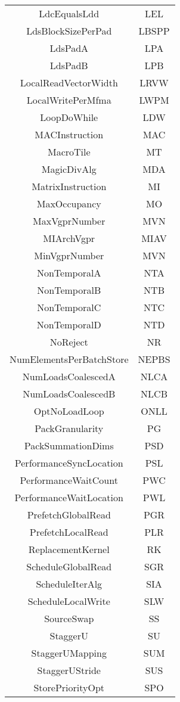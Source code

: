 \documentclass[]{article}
\begin{document}
\begin{center}
\begin{small}
\begin{longtable}{ |c|c| }
 LdcEqualsLdd & LEL \\
 LdsBlockSizePerPad & LBSPP \\
 LdsPadA & LPA \\
 LdsPadB & LPB \\
 LocalReadVectorWidth & LRVW \\
 LocalWritePerMfma & LWPM \\
 LoopDoWhile & LDW \\
 MACInstruction & MAC \\
 MacroTile & MT \\
 MagicDivAlg & MDA \\
 MatrixInstruction & MI \\
 MaxOccupancy & MO \\
 MaxVgprNumber & MVN \\
 MIArchVgpr & MIAV \\
 MinVgprNumber & MVN \\
 NonTemporalA & NTA \\
 NonTemporalB & NTB \\
 NonTemporalC & NTC \\
 NonTemporalD & NTD \\
 NoReject & NR \\
 NumElementsPerBatchStore & NEPBS \\
 NumLoadsCoalescedA & NLCA \\
 NumLoadsCoalescedB & NLCB \\
 OptNoLoadLoop & ONLL \\
 PackGranularity & PG \\
 PackSummationDims & PSD \\
 PerformanceSyncLocation & PSL \\
 PerformanceWaitCount & PWC \\
 PerformanceWaitLocation & PWL \\
 PrefetchGlobalRead & PGR \\
 PrefetchLocalRead & PLR \\
 ReplacementKernel & RK \\
 ScheduleGlobalRead & SGR \\
 ScheduleIterAlg & SIA \\
 ScheduleLocalWrite & SLW \\
 SourceSwap & SS \\
 StaggerU & SU \\
 StaggerUMapping & SUM \\
 StaggerUStride & SUS \\
 StorePriorityOpt & SPO \\

\end{longtable}
\end{small}
\end{center}
\end{document}
